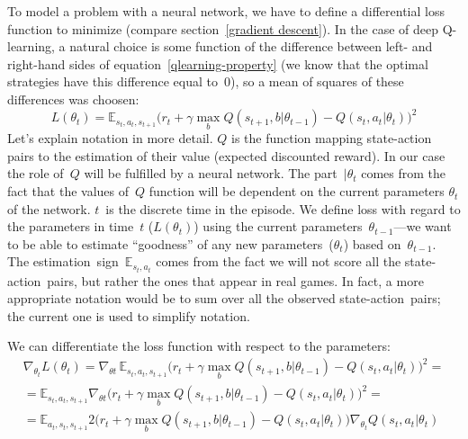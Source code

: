 To model a problem with a neural network, we have to define a differential loss function to minimize (compare section~\ref{gradient descent}). In the case of deep Q-learning, a natural choice is some function of the difference between left- and right-hand sides of equation~\eqref{qlearning-property} (we know that the optimal strategies have this difference equal to~$0$), so a mean of squares of these differences was choosen:
\begin{equation}\label{dqn-loss}
  L(\theta_t) = \mathbb{E}_{s_t, a_t, s_{t+1}} \big(r_t + \gamma \max_b Q(s_{t+1}, b|\theta_{t-1}) - Q(s_t, a_t|\theta_t)\big)^2
\end{equation}
Let's explain notation in more detail. $Q$ is the function mapping state-action pairs to the estimation of their value (expected discounted reward). In our case the role of~$Q$ will be fulfilled by a neural network. The part~$|\theta_t$ comes from the fact that the values of~$Q$ function will be dependent on the current parameters $\theta_t$ of the network. $t$~is the discrete time in the episode. We define loss with regard to the parameters in time~$t$ ($L(\theta_t)$) using the current parameters~$\theta_{t-1}$---we want to be able to estimate ``goodness'' of any new parameters~($\theta_t$) based on~$\theta_{t-1}$. The estimation~sign~$\mathbb{E}_{s_t, a_t}$ comes from the fact we will not score all the state-action~pairs, but rather the ones that appear in real games. In fact, a more appropriate notation would be to sum over all the observed state-action~pairs; the current one is used to simplify notation.

We can differentiate the loss function with respect to the parameters:
\begin{multline}
  \nabla_{\theta_t} L(\theta_t) = \nabla_{\theta t}\, \mathbb{E}_{s_t, a_t, s_{t+1}} \big(r_t + \gamma \max_b Q(s_{t+1}, b|\theta_{t-1}) - Q(s_t, a_t|\theta_t)\big)^2
 =\\=
  \mathbb{E}_{s_t, a_t, s_{t+1}} \nabla_{\theta t} \big(r_t + \gamma \max_b Q(s_{t+1}, b|\theta_{t-1}) - Q(s_t, a_t|\theta_t)\big)^2
  =\\=
  \mathbb{E}_{a_t,s_t, s_{t+1}} 2\Big(
  r_t + \gamma \max_b Q(s_{t+1}, b|\theta_{t-1}) - Q(s_t, a_t|\theta_t)\Big)
  \nabla_{\theta_t} Q(s_t, a_t|\theta_t)
\end{multline}

